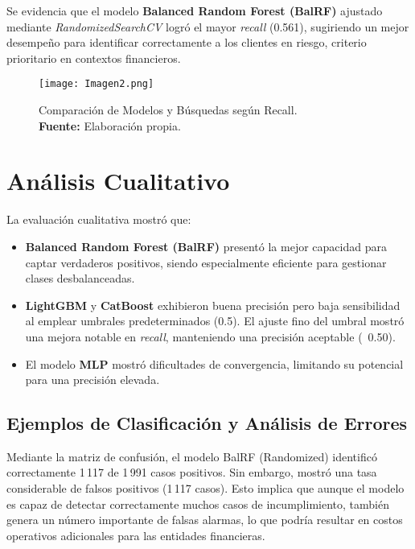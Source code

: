 \documentclass[journal]{apa7}
\begin{document}
\FloatBarrier  %

Se evidencia que el modelo \textbf{Balanced Random Forest (BalRF)} ajustado mediante \emph{RandomizedSearchCV} logró el mayor \emph{recall} (0.561), sugiriendo un mejor desempeño para identificar correctamente a los clientes en riesgo, criterio prioritario en contextos financieros.

\begin{figure}[H]       %
  \centering
  \texttt{[image: Imagen2.png]}
  \caption{Comparación de Modelos y Búsquedas según Recall.\\\textbf{Fuente:} Elaboración propia.}
  \label{fig:comparacion-recall}
\end{figure}
\section{Análisis Cualitativo}

La evaluación cualitativa mostró que:

\begin{itemize}
  \item \textbf{Balanced Random Forest (BalRF)} presentó la mejor capacidad para captar verdaderos positivos, siendo especialmente eficiente para gestionar clases desbalanceadas.
  \item \textbf{LightGBM} y \textbf{CatBoost} exhibieron buena precisión pero baja sensibilidad al emplear umbrales predeterminados (0.5). El ajuste fino del umbral mostró una mejora notable en \emph{recall}, manteniendo una precisión aceptable (~0.50).
  \item El modelo \textbf{MLP} mostró dificultades de convergencia, limitando su potencial para una precisión elevada.
\end{itemize}
\subsection{Ejemplos de Clasificación y Análisis de Errores}

Mediante la matriz de confusión, el modelo BalRF (Randomized) identificó correctamente 1\,117 de 1\,991 casos positivos. Sin embargo, mostró una tasa considerable de falsos positivos (1\,117 casos). Esto implica que aunque el modelo es capaz de detectar correctamente muchos casos de incumplimiento, también genera un número importante de falsas alarmas, lo que podría resultar en costos operativos adicionales para las entidades financieras.
\end{document}
